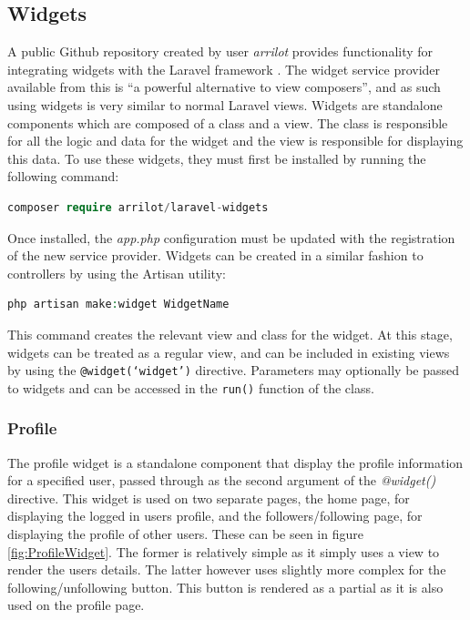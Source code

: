\subsection{Widgets}
A public Github repository created by user \textit{arrilot} provides functionality for integrating widgets with the Laravel framework \cite{Packagist:LaravelWidgets}. The widget service provider available from this is ``a powerful alternative to view composers'', and as such using widgets is very similar to normal Laravel views. Widgets are standalone components which are composed of a class and a view. The class is responsible for all the logic and data for the widget and the view is responsible for displaying this data. To use these widgets, they must first be installed by running the following command:

\begin{lstlisting}[language=php]
 composer require arrilot/laravel-widgets
\end{lstlisting}

Once installed, the \textit{app.php} configuration must be updated with the registration of the new service provider. Widgets can be created in a similar fashion to controllers by using the Artisan utility:

\begin{lstlisting}[language=php]
 php artisan make:widget WidgetName
\end{lstlisting}

This command creates the relevant view and class for the widget. At this stage, widgets can be treated as a regular view, and can be included in existing views by using the \texttt{@widget(`widget')} directive. Parameters may optionally be passed to widgets and can be accessed in the \texttt{run()} function of the class.

\subsubsection{Profile}
The profile widget is a standalone component that display the profile information for a specified user, passed through as the second argument of the \textit{@widget()} directive. This widget is used on two separate pages, the home page, for displaying the logged in users profile, and the followers/following page, for displaying the profile of other users. These can be seen in figure \ref{fig:ProfileWidget}. The former is relatively simple as it simply uses a view to render the users details. The latter however uses slightly more complex for the following/unfollowing button. This button is rendered as a partial as it is also used on the profile page.

